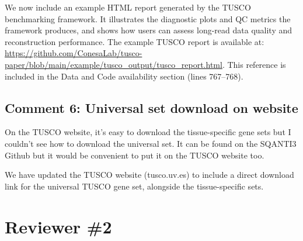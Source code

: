 \documentclass[11pt]{article}
\begin{document}
\begin{responseboxnew}
We now include an example HTML report generated by the TUSCO benchmarking framework. It illustrates the diagnostic plots and QC metrics the framework produces, and shows how users can assess long-read data quality and reconstruction performance. The example TUSCO report is available at: \url{https://github.com/ConesaLab/tusco-paper/blob/main/example/tusco_output/tusco_report.html}. This reference is included in the Data and Code availability section (lines 767--768).
\end{responseboxnew}

\subsection{Comment 6: Universal set download on website}

\begin{reviewercomment}
On the TUSCO website, it's easy to download the tissue-specific gene sets but I couldn't see how to download the universal set. It can be found on the SQANTI3 Github but it would be convenient to put it on the TUSCO website too.
\end{reviewercomment}

\begin{responseboxnew}
We have updated the TUSCO website (tusco.uv.es) to include a direct download link for the universal TUSCO gene set, alongside the tissue-specific sets.
\end{responseboxnew}

\newpage

\section{Reviewer \#2}
\end{document}
